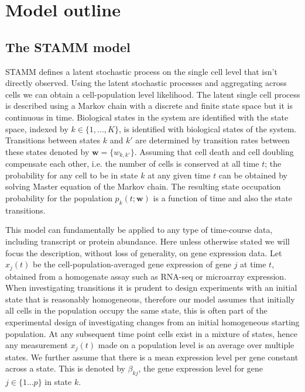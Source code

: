 \section{Model outline}
\label{sec:method}

\subsection{The STAMM model}
\label{sec:mast-model}


STAMM defines a latent stochastic process on the single cell level that isn't directly observed. Using the latent stochastic processes and aggregating across cells we can obtain a cell-population level likelihood. The latent single cell process is described using a Markov chain with a discrete and finite state space but it is continuous in time. Biological states in the system are identified with the state space, indexed by $k \in \lbrace 1, ..., K \rbrace$, is identified with biological states of the system. Transitions between states $k$ and $k'$ are determined by transition rates between these states denoted by $\mathbf{w} = \lbrace w_{k,k'} \rbrace $. Assuming that cell death and cell doubling compensate each other, i.e. the number of cells is conserved at all time $t$; the probability for any cell to be in state $k$ at any given time $t$ can be obtained by solving Master equation of the Markov chain. The resulting state occupation probability for the population $p_k(t;\mathbf{w})$ is a function of time and also the state transitions.

This model can fundamentally be applied to any type of time-course data, including transcript or protein abundance. Here unless otherwise stated we will focus the description, without loss of generality, on gene expression data. Let $x_j(t)$ be the cell-population-averaged gene expression of gene $j$ at time $t$, obtained from a homogenate assay such as RNA-seq or microarray expression. When investigating transitions it is prudent to design experiments with an initial state that is reasonably homogeneous, therefore our model assumes that initially all cells in the population occupy the same state, this is often part of the experimental design of investigating changes from an initial homogeneous starting population. At any subsequent time point cells exist in a mixture of states, hence any measurement $x_j(t)$ made on a population level is an average over multiple states. We further assume that there is a mean expression level per gene constant across a state. This is denoted by $\beta_{kj}$, the gene expression level for gene $j \in \lbrace 1 \ldots p \rbrace$ in state $k$.

